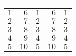 %
\begin{table}[!tbp]
\begin{center}
\begin{tabular}{rrrrr}
\hline\hline
\multicolumn{1}{c}{}&\multicolumn{1}{c}{}&\multicolumn{1}{c}{}&\multicolumn{1}{c}{}&\multicolumn{1}{c}{}\tabularnewline
\hline
$1$&$ 6$&$1$&$ 6$&$1$\tabularnewline
$2$&$ 7$&$2$&$ 7$&$2$\tabularnewline
$3$&$ 8$&$3$&$ 8$&$3$\tabularnewline
$4$&$ 9$&$4$&$ 9$&$4$\tabularnewline
$5$&$10$&$5$&$10$&$5$\tabularnewline
\hline
\end{tabular}
\end{center}
\end{table}

